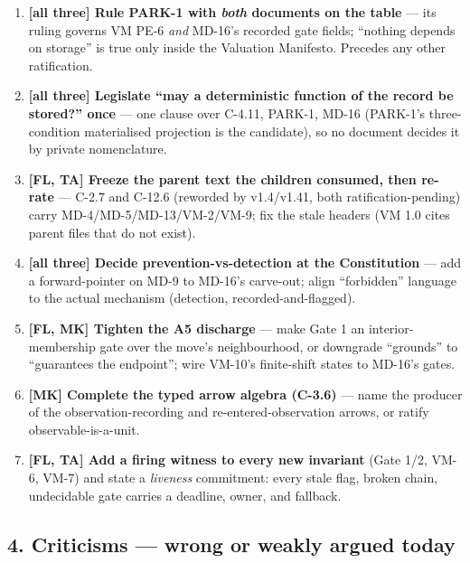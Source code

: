 \begin{enumerate}\setlength{\itemsep}{0pt}
  \item \textbf{[all three] Rule PARK-1 with \emph{both} documents on the table} --- its ruling
  governs VM PE-6 \emph{and} MD-16's recorded gate fields; ``nothing depends on storage'' is
  true only inside the Valuation Manifesto. Precedes any other ratification.
  \item \textbf{[all three] Legislate ``may a deterministic function of the record be stored?''
  once} --- one clause over C-4.11, PARK-1, MD-16 (PARK-1's three-condition materialised
  projection is the candidate), so no document decides it by private nomenclature.
  \item \textbf{[FL, TA] Freeze the parent text the children consumed, then re-rate} --- C-2.7
  and C-12.6 (reworded by v1.4/v1.41, both ratification-pending) carry MD-4/MD-5/MD-13/VM-2/VM-9;
  fix the stale headers (VM 1.0 cites parent files that do not exist).
  \item \textbf{[all three] Decide prevention-vs-detection at the Constitution} --- add a
  forward-pointer on MD-9 to MD-16's carve-out; align ``forbidden'' language to the actual
  mechanism (detection, recorded-and-flagged).
  \item \textbf{[FL, MK] Tighten the A5 discharge} --- make Gate 1 an interior-membership gate
  over the move's neighbourhood, or downgrade ``grounds'' to ``guarantees the endpoint''; wire
  VM-10's finite-shift states to MD-16's gates.
  \item \textbf{[MK] Complete the typed arrow algebra (C-3.6)} --- name the producer of the
  observation-recording and re-entered-observation arrows, or ratify observable-is-a-unit.
  \item \textbf{[FL, TA] Add a firing witness to every new invariant} (Gate 1/2, VM-6, VM-7) and
  state a \emph{liveness} commitment: every stale flag, broken chain, undecidable gate carries a
  deadline, owner, and fallback.
\end{enumerate}

\subsection*{4. Criticisms --- wrong or weakly argued today}

